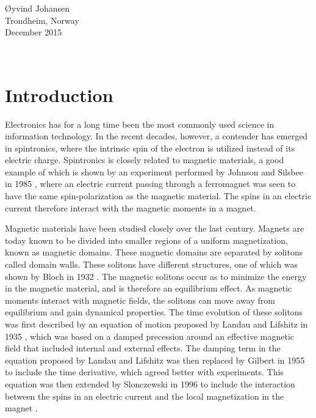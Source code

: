 \documentclass[12pt, a4paper, twoside, openright]{article}		%
\let\oldsection\section
\def\section{\cleardoublepage\oldsection}
\newcommand\blankpage{%
    \null
    \thispagestyle{empty}%
    \addtocounter{page}{-1}%
    \newpage}
\numberwithin{equation}{section}
\begin{document}
\begin{minipage}{0.95\textwidth}
\begin{flushright}
\O yvind Johansen \\
Trondheim, Norway \\
December 2015
\end{flushright}
\end{minipage}\\[4cm]

\newpage

\tableofcontents

\newpage
\afterpage{\blankpage}


\section{Introduction}
Electronics has for a long time been the most commonly used science in information technology. In the recent decades, however, a contender has emerged in spintronics, where the intrinsic spin of the electron is utilized instead of its electric charge. Spintronics is closely related to magnetic materials, a good example of which is shown by an experiment performed by Johnson and Silsbee in 1985 \cite{JohnsonSilsbee1985}, where an electric current passing through a ferromagnet was seen to have the same spin-polarization as the magnetic material. The spins in an electric current therefore interact with the magnetic moments in a magnet.

Magnetic materials have been studied closely over the last century. Magnets are today known to be divided into smaller regions of a uniform magnetization, known as magnetic domains. These magnetic domains are separated by solitons called domain walls. These solitons have different structures, one of which was shown by Bloch in 1932 \cite{Bloch1932}. The magnetic solitons occur as to minimize the energy in the magnetic material, and is therefore an equilibrium effect. As magnetic moments interact with magnetic fields, the solitons can move away from equilibrium and gain dynamical properties. The time evolution of these solitons was first described by an equation of motion proposed by Landau and Lifshitz in 1935 \cite{LandauLifshitz1935}, which was based on a damped precession around an effective magnetic field that included internal and external effects. The damping term in the equation proposed by Landau and Lifshitz was then replaced by Gilbert in 1955 \cite{Gilbert2004Classics} to include the time derivative, which agreed better with experiments. This equation was then extended by Slonczewski in 1996 to include the interaction between the spins in an electric current and the local magnetization in the magnet \cite{Slonczewski1996}.
\end{document}

